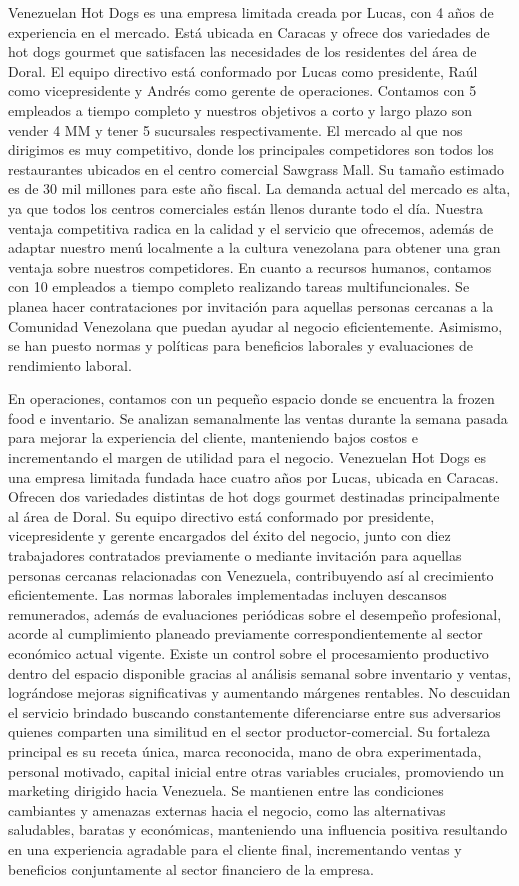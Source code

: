 Venezuelan Hot Dogs es una empresa limitada creada por Lucas, con 4 años de experiencia en el mercado. Está ubicada en Caracas y ofrece dos variedades de hot dogs gourmet que satisfacen las necesidades de los residentes del área de Doral. El equipo directivo está conformado por Lucas como presidente, Raúl como vicepresidente y Andrés como gerente de operaciones. Contamos con 5 empleados a tiempo completo y nuestros objetivos a corto y largo plazo son vender 4 MM y tener 5 sucursales respectivamente.
El mercado al que nos dirigimos es muy competitivo, donde los principales competidores son todos los restaurantes ubicados en el centro comercial Sawgrass Mall. Su tamaño estimado es de 30 mil millones para este año fiscal. La demanda actual del mercado es alta, ya que todos los centros comerciales están llenos durante todo el día. Nuestra ventaja competitiva radica en la calidad y el servicio que ofrecemos, además de adaptar nuestro menú localmente a la cultura venezolana para obtener una gran ventaja sobre nuestros competidores.
En cuanto a recursos humanos, contamos con 10 empleados a tiempo completo realizando tareas multifuncionales. Se planea hacer contrataciones por invitación para aquellas personas cercanas a la Comunidad Venezolana que puedan ayudar al negocio eficientemente. Asimismo, se han puesto normas y políticas para beneficios laborales y evaluaciones de rendimiento laboral. 

En operaciones, contamos con un pequeño espacio donde se encuentra la frozen food e inventario. Se analizan semanalmente las ventas durante la semana pasada para mejorar la experiencia del cliente, manteniendo bajos costos e incrementando el margen de utilidad para el negocio.
Venezuelan Hot Dogs es una empresa limitada fundada hace cuatro años por Lucas, ubicada en Caracas. Ofrecen dos variedades distintas de hot dogs gourmet destinadas principalmente al área de Doral. Su equipo directivo está conformado por presidente, vicepresidente y gerente encargados del éxito del negocio, junto con diez trabajadores contratados previamente o mediante invitación para aquellas personas cercanas relacionadas con Venezuela, contribuyendo así al crecimiento eficientemente. Las normas laborales implementadas incluyen descansos remunerados, además de evaluaciones periódicas sobre el desempeño profesional, acorde al cumplimiento planeado previamente correspondientemente al sector económico actual vigente. Existe un control sobre el procesamiento productivo dentro del espacio disponible gracias al análisis semanal sobre inventario y ventas, lográndose mejoras significativas y aumentando márgenes rentables. No descuidan el servicio brindado buscando constantemente diferenciarse entre sus adversarios quienes comparten una similitud en el sector productor-comercial. Su fortaleza principal es su receta única, marca reconocida, mano de obra experimentada, personal motivado, capital inicial entre otras variables cruciales, promoviendo un marketing dirigido hacia Venezuela. Se mantienen entre las condiciones cambiantes y amenazas externas hacia el negocio, como las alternativas saludables, baratas y económicas, manteniendo una influencia positiva resultando en una experiencia agradable para el cliente final, incrementando ventas y beneficios conjuntamente al sector financiero de la empresa.

